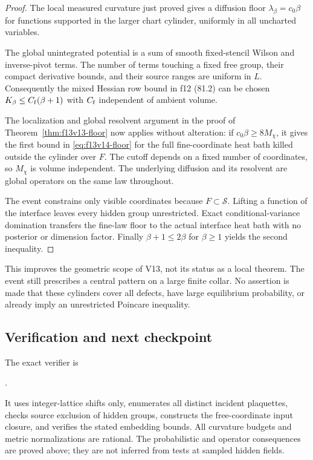 \documentclass[11pt,oneside]{article}
\begin{document}
\begin{proof}
The local measured curvature just
proved gives a diffusion floor
\(\lambda_\beta=c_0\beta\) for
functions supported in the larger
chart cylinder, uniformly in all
uncharted variables.

The global unintegrated potential is
a sum of smooth fixed-stencil Wilson
and inverse-pivot terms. The number
of terms touching a fixed free group,
their compact derivative bounds,
and their source ranges are uniform
in \(L\). Consequently the mixed
Hessian row bound in f12 (81.2) can
be chosen
\(K_\beta\le C_{\rm f}(\beta+1)\)
with \(C_{\rm f}\) independent of
ambient volume.

The localization and global resolvent
argument in the proof of
Theorem~\ref{thm:f13v13-floor} now
applies without alteration:
if \(c_0\beta\ge8M_\chi\), it gives
the first bound in
\eqref{eq:f13v14-floor} for the
full fine-coordinate heat bath
killed outside the cylinder over
\(F\). The cutoff depends on a
fixed number of coordinates, so
\(M_\chi\) is volume independent.
The underlying diffusion and its
resolvent are global operators on
the same law throughout.

The event constrains only visible
coordinates because \(F\subset
\mathcal S\). Lifting a function
of the interface leaves every
hidden group unrestricted.
Exact conditional-variance
domination transfers the fine-law
floor to the actual interface
heat bath with no posterior or
dimension factor. Finally
\(\beta+1\le2\beta\) for
\(\beta\ge1\) yields the second
inequality.
\end{proof}

This improves the geometric scope of
V13, not its status as a local theorem.
The event still prescribes a central
pattern on a large finite collar.
No assertion is made that these
cylinders cover all defects, have
large equilibrium probability, or
already imply an unrestricted
Poincare inequality.

\subsection{Verification and next checkpoint}

The exact verifier is
\begin{center}\small
{}.
\end{center}
It uses integer-lattice shifts only,
enumerates all distinct incident
plaquettes, checks source exclusion
of hidden groups, constructs the
free-coordinate input closure, and
verifies the stated embedding bounds.
All curvature budgets and metric
normalizations are rational. The
probabilistic and operator consequences
are proved above; they are not inferred
from tests at sampled hidden fields.
\end{document}
